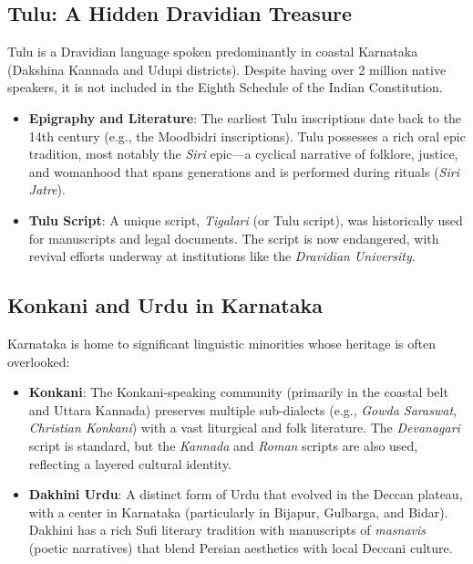 \documentclass[12pt]{article}
\begin{document}
\subsection{Tulu: A Hidden Dravidian Treasure}
Tulu is a Dravidian language spoken predominantly in coastal Karnataka (Dakshina Kannada and Udupi districts). Despite having over 2 million native speakers, it is not included in the Eighth Schedule of the Indian Constitution.
\begin{itemize}
    \item \textbf{Epigraphy and Literature}: The earliest Tulu inscriptions date back to the 14th century (e.g., the Moodbidri inscriptions). Tulu possesses a rich oral epic tradition, most notably the \textit{Siri} epic—a cyclical narrative of folklore, justice, and womanhood that spans generations and is performed during rituals (\textit{Siri Jatre}).
    \item \textbf{Tulu Script}: A unique script, \textit{Tigalari} (or Tulu script), was historically used for manuscripts and legal documents. The script is now endangered, with revival efforts underway at institutions like the \textit{Dravidian University}.
\end{itemize}

\subsection{Konkani and Urdu in Karnataka}
Karnataka is home to significant linguistic minorities whose heritage is often overlooked:
\begin{itemize}
    \item \textbf{Konkani}: The Konkani-speaking community (primarily in the coastal belt and Uttara Kannada) preserves multiple sub-dialects (e.g., \textit{Gowda Saraswat, Christian Konkani}) with a vast liturgical and folk literature. The \textit{Devanagari} script is standard, but the \textit{Kannada} and \textit{Roman} scripts are also used, reflecting a layered cultural identity.
    \item \textbf{Dakhini Urdu}: A distinct form of Urdu that evolved in the Deccan plateau, with a center in Karnataka (particularly in Bijapur, Gulbarga, and Bidar). Dakhini has a rich Sufi literary tradition with manuscripts of \textit{masnavis} (poetic narratives) that blend Persian aesthetics with local Deccani culture.
\end{itemize}
\end{document}

